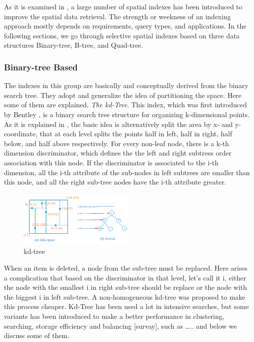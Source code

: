 \documentclass[a4paper,12pt]{article}
\begin{document}
As it is examined in \cite{survey}, a large number of spatial indexes has been introduced to improve the spatial data retrieval.
The strength or weekness of an indexing approach mostly depends on requirements, query types, and applications. In the following sections, we go through selective spatial indexes based on three data structures Binary-tree, B-tree, and Quad-tree.

\subsubsection{Binary-tree Based}
The indexes in this group are basically and conceptually derived from the binary search tree. They adopt and generalize the idea of partitioning the space. Here some of them are explained.
\emph{The kd-Tree}.
This index, which was first introduced by Bentley \cite{bently1975}, is a binary search tree structure for organizing k-dimensional points. As it is explained in \cite{bently1975}, the basic idea is alternatively split the area by x- and y-coordinate, that at each level splits the points half in left, half in right, half below, and half above respectively. For every non-leaf node, there is a k-th dimension discriminator, which defines the the left and right subtrees order association with this node. If the discriminator is associated to the i-th dimension, all the i-th attribute of the sub-nodes in left subtrees are smaller than this node, and all the right sub-tree nodes have the i-th attribute greater.

\begin{figure}
\centering
\includegraphics[width=0.5\textwidth]{kdtree}
\caption{kd-tree}
\label{figkdtree}
\end{figure}


When an item is deleted, a node from the sub-tree must be replaced. Here arises a complication that based on the discriminator in that level, let's call it i, either the node with the smallest i in right sub-tree should be replace or  the node with the biggest i in left sub-tree. A non-homogeneous kd-tree was proposed to make this process cheaper. 
Kd-Tree has been used a lot in intensive searches, but some variants has been introduced to make a better performance in clustering, searching, storage efficiency and balancing [survay], such as …..
and below we discuss some of them.
\end{document}
